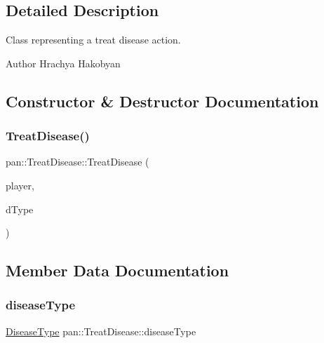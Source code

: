 \subsection{Detailed Description}
Class representing a treat disease action. 

\begin{DoxyAuthor}{Author}
Hrachya Hakobyan 
\end{DoxyAuthor}


\subsection{Constructor \& Destructor Documentation}
\mbox{\label{classpan_1_1_treat_disease_a5c47ff414235ac559fb2236ddb00dcaa}} 
\subsubsection{\texorpdfstring{Treat\+Disease()}{TreatDisease()}}
{\footnotesize\ttfamily pan\+::\+Treat\+Disease\+::\+Treat\+Disease (\begin{DoxyParamCaption}\item[{\hyperlink{namespacepan_a0cdabf874fbf1bb3a1f0152d108c2909}{Player\+Index}}]{player,  }\item[{\hyperlink{namespacepan_a48851b51b0aef3f0e1be80df5031d9d7}{Disease\+Type}}]{d\+Type }\end{DoxyParamCaption})}



\subsection{Member Data Documentation}
\mbox{\label{classpan_1_1_treat_disease_a9ab5c64aa8c996c62a25b6f1fdf1d4c6}} 
\subsubsection{\texorpdfstring{disease\+Type}{diseaseType}}
{\footnotesize\ttfamily \hyperlink{namespacepan_a48851b51b0aef3f0e1be80df5031d9d7}{Disease\+Type} pan\+::\+Treat\+Disease\+::disease\+Type}

